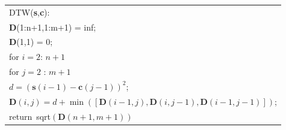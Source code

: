 \begin{multicols}{2}
\setcounter{figure}{1}
\begin{figure*}[b] %
{\small 
\begin{center}
\begin{tabular}{l}
\hline
DTW(\textbf{s},\textbf{c}):\\
\hspace*{3mm}$\boldsymbol{D}$(1:n+1,1:m+1) = inf;\\
\hspace*{3mm}$\boldsymbol{D}$(1,1) = 0;\\
\hspace*{3mm}for $i = 2$: $n+1$\\
\hspace*{6mm}for $j = 2$ : $m+1$\\
\hspace*{9mm}$d = (\textbf{s}(i-1)-\textbf{c}(j-1))^2$;\\
\hspace*{9mm}$\boldsymbol{D}(i,j) = d + \min( 
[ \boldsymbol{D}(i-1,j), \boldsymbol{D}(i,j-1), \boldsymbol{D}(i-1,j-1) ])$;\\
return\ sqrt$(\boldsymbol{D}(n+1,m+1))$\\
\hline
\end{tabular}
\end{center}}
\vspace*{-9pt}


\end{figure*}
\end{multicols}

